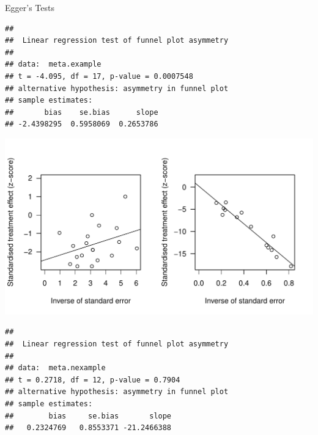 \documentclass[english]{beamer}\usepackage[]{graphicx}\usepackage[]{color}
\makeatletter
\def\maxwidth{ %
  \ifdim\Gin@nat@width>\linewidth
    \linewidth
  \else
    \Gin@nat@width
  \fi
}
\newenvironment{kframe}{%
 \def\at@end@of@kframe{}%
 \ifinner\ifhmode%
  \def\at@end@of@kframe{\end{minipage}}%
  \begin{minipage}{\columnwidth}%
 \fi\fi%
 \def\FrameCommand##1{\hskip\@totalleftmargin \hskip-\fboxsep
 \colorbox{shadecolor}{##1}\hskip-\fboxsep
     \hskip-\linewidth \hskip-\@totalleftmargin \hskip\columnwidth}%
 \MakeFramed {\advance\hsize-\width
   \@totalleftmargin\z@ \linewidth\hsize
   \@setminipage}}%
 {\par\unskip\endMakeFramed%
 \at@end@of@kframe}
\newenvironment{knitrout}{}{} %
\makeatother
\begin{document}
\begin{frame}[fragile]{Egger's Tests}

\vspace{-6cm}

\begin{knitrout}
\color{fgcolor}\begin{kframe}
\begin{verbatim}
## 
## 	Linear regression test of funnel plot asymmetry
## 
## data:  meta.example
## t = -4.095, df = 17, p-value = 0.0007548
## alternative hypothesis: asymmetry in funnel plot
## sample estimates:
##       bias    se.bias      slope 
## -2.4398295  0.5958069  0.2653786
\end{verbatim}
\end{kframe}
\includegraphics[width=\maxwidth]{figure/unnamed-chunk-8-1} 
\begin{kframe}\begin{verbatim}
## 
## 	Linear regression test of funnel plot asymmetry
## 
## data:  meta.nexample
## t = 0.2718, df = 12, p-value = 0.7904
## alternative hypothesis: asymmetry in funnel plot
## sample estimates:
##        bias     se.bias       slope 
##   0.2324769   0.8553371 -21.2466388
\end{verbatim}
\end{kframe}
\end{knitrout}

\end{frame}
\end{document}
